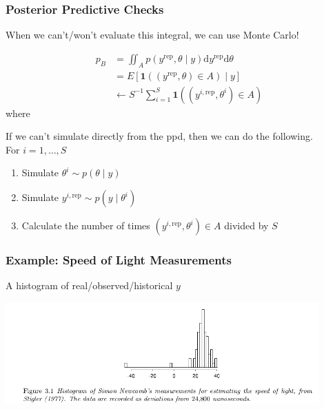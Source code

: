 \documentclass{beamer}
\begin{document}
\begin{frame}
\frametitle{Posterior Predictive Checks}

When we can't/won't evaluate this integral, we can use Monte Carlo!

\begin{align*}
p_B &= \iint_{A} p(y^{\text{rep}}, \theta \mid y) \text{d} y^{\text{rep}}\text{d} \theta \\
&= E \left[ \mathbf{1}( (y^{\text{rep}}, \theta) \in A) \mid y\right] \\
&\leftarrow S^{-1}\sum_{i=1}^S \mathbf{1}( (y^{i,\text{rep}}, \theta^i) \in A) 
\end{align*}
where 

If we can't simulate directly from the ppd, then we can do the following. \\
For $i=1,\ldots,S$
\begin{enumerate}
\item Simulate $\theta^i \sim p(\theta \mid y)$
\item Simulate $y^{i,\text{rep}} \sim p(y \mid \theta^i)$
\item Calculate the number of times $(y^{i,\text{rep}}, \theta^i) \in
  A$ divided by $S$
\end{enumerate}

\end{frame}

\begin{frame}
\frametitle{Example: Speed of Light Measurements}

A histogram of real/observed/historical $y$
\begin{center}
\includegraphics[width=120mm]{speed_light_data.png}
\end{center}

\end{frame}
\end{document}
